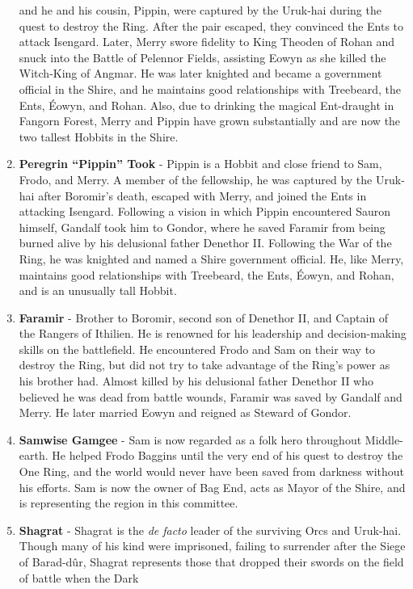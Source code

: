 \documentclass[10pt, letterpaper]{article}
\begin{document}
\begin{enumerate}
  and he and his cousin, Pippin, were captured by the Uruk-hai during
  the quest to destroy the Ring. After the pair escaped, they convinced
  the Ents to attack Isengard. Later, Merry swore fidelity to King
  Theoden of Rohan and snuck into the Battle of Pelennor Fields,
  assisting Eowyn as she killed the Witch-King of Angmar. He was later
  knighted and became a government official in the Shire, and he
  maintains good relationships with Treebeard, the Ents, Éowyn, and
  Rohan. Also, due to drinking the magical Ent-draught in Fangorn
  Forest, Merry and Pippin have grown substantially and are now the two
  tallest Hobbits in the Shire.
\item
  \textbf{Peregrin ``Pippin'' Took} - Pippin is a Hobbit and close
  friend to Sam, Frodo, and Merry. A member of the fellowship, he was
  captured by the Uruk-hai after Boromir's death, escaped with Merry,
  and joined the Ents in attacking Isengard. Following a vision in which
  Pippin encountered Sauron himself, Gandalf took him to Gondor, where
  he saved Faramir from being burned alive by his delusional father
  Denethor II. Following the War of the Ring, he was knighted and named
  a Shire government official. He, like Merry, maintains good
  relationships with Treebeard, the Ents, Éowyn, and Rohan, and is an
  unusually tall Hobbit.
\item
  \textbf{Faramir} - Brother to Boromir, second son of Denethor II, and
  Captain of the Rangers of Ithilien. He is renowned for his leadership
  and decision-making skills on the battlefield. He encountered Frodo
  and Sam on their way to destroy the Ring, but did not try to take
  advantage of the Ring's power as his brother had. Almost killed by his
  delusional father Denethor II who believed he was dead from battle
  wounds, Faramir was saved by Gandalf and Merry. He later married Eowyn
  and reigned as Steward of Gondor.
\item
  \textbf{Samwise Gamgee} - Sam is now regarded as a folk hero
  throughout Middle-earth. He helped Frodo Baggins until the very end of
  his quest to destroy the One Ring, and the world would never have been
  saved from darkness without his efforts. Sam is now the owner of Bag
  End, acts as Mayor of the Shire, and is representing the region in
  this committee.
\item
  \textbf{Shagrat} - Shagrat is the \emph{de facto} leader of the
  surviving Orcs and Uruk-hai. Though many of his kind were imprisoned,
  failing to surrender after the Siege of Barad-dûr, Shagrat represents
  those that dropped their swords on the field of battle when the Dark

\end{enumerate}
\end{document}
